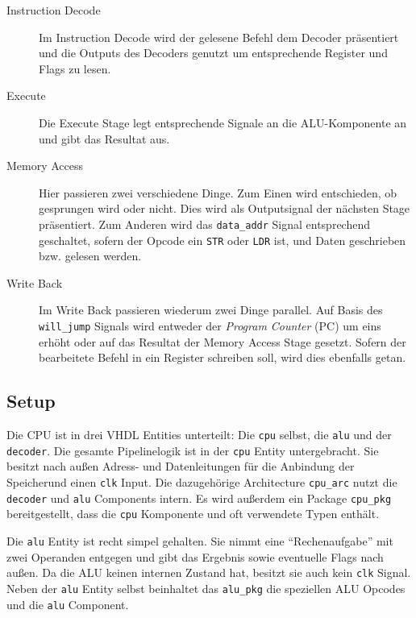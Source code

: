 \documentclass[paper=a4,fontsize=12pt,twocolumn]{scrreprt}
\begin{document}
\begin{description}
  \item[Instruction Decode]
  Im Instruction Decode wird der gelesene Befehl dem Decoder präsentiert und die Outputs des Decoders genutzt um entsprechende Register und Flags zu lesen.
  \item[Execute]
  Die Execute Stage legt entsprechende Signale an die ALU-Komponente an und gibt das Resultat aus.
  \item[Memory Access]
  Hier passieren zwei verschiedene Dinge.
  Zum Einen wird entschieden, ob gesprungen wird oder nicht.
  Dies wird als Outputsignal der nächsten Stage präsentiert.
  Zum Anderen wird das \texttt{data\_addr} Signal entsprechend geschaltet, sofern der Opcode ein \texttt{STR} oder \texttt{LDR} ist, und Daten geschrieben bzw. gelesen werden.
  \item[Write Back]
  Im Write Back passieren wiederum zwei Dinge parallel.
  Auf Basis des \texttt{will\_jump} Signals wird entweder der \textit{Program Counter} (PC) um eins erhöht oder auf das Resultat der Memory Access Stage gesetzt.
  Sofern der bearbeitete Befehl in ein Register schreiben soll, wird dies ebenfalls getan.
\end{description}

\subsection{Setup}
\label{subsec:setup}

Die CPU ist in drei VHDL Entities unterteilt: Die \texttt{cpu} selbst, die \texttt{alu} und der \texttt{decoder}.
Die gesamte Pipelinelogik ist in der \texttt{cpu} Entity untergebracht.
Sie besitzt nach außen Adress- und Datenleitungen für die Anbindung der Speicher\footnotemark und einen \texttt{clk} Input.
Die dazugehörige Architecture \texttt{cpu\_arc} nutzt die \texttt{decoder} und \texttt{alu} Components intern.
Es wird außerdem ein Package \texttt{cpu\_pkg} bereitgestellt, dass die \texttt{cpu} Komponente und oft verwendete Typen enthält.

Die \texttt{alu} Entity ist recht simpel gehalten.
Sie nimmt eine \enquote{Rechenaufgabe} mit zwei Operanden entgegen und gibt das Ergebnis sowie eventuelle Flags nach außen.
Da die ALU keinen internen Zustand hat, besitzt sie auch kein \texttt{clk} Signal.
Neben der \texttt{alu} Entity selbst beinhaltet das \texttt{alu\_pkg} die speziellen ALU Opcodes und die \texttt{alu} Component.
\end{document}
